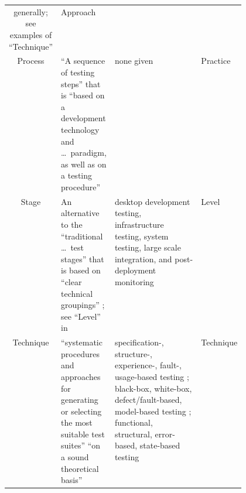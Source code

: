 \begin{table}[hbtp!]
\begin{tabularx}{\linewidth}{|c|X|m{0.37\linewidth}|m{0.1\linewidth}|}
            generally; see examples of
            ``Technique''                      & Approach                                                    \\
            Process                            & ``A sequence of
            testing steps'' \citep[p.~2]{BarbosaEtAl2006} that
            is ``based on a development technology and \dots\
            paradigm, as well as on a testing procedure''
            \citep[p.~3]{BarbosaEtAl2006}      & none given         & Practice                               \\
            Stage                              & An
            alternative to the ``traditional \dots\ test stages'' that is based on
            ``clear technical groupings'' \citep[p.~13]{Gerrard2000a}; see ``Level'' in
            \nameref{tab:ieeeTestTerms}        & desktop
            development testing, infrastructure testing, system testing,
            large scale integration, and post-deployment monitoring
            \citep[p.~13]{Gerrard2000a}        & Level                                                       \\
            Technique                          & ``systematic
            procedures and approaches for generating or selecting the most suitable test
            suites'' \citep[p.~5-10]{SWEBOK2024} ``on a sound theoretical basis''
            \citep[p.~3]{BarbosaEtAl2006}      & specification-,
            structure-, experience-, fault-, usage-based testing \citep[pp.~5-10, 5-13 to 5-15]{SWEBOK2024};
            black-box, white-box, defect/fault-based, model-based testing \citep[p.~3]{SouzaEtAl2017};
            functional, structural, error-based, state-based testing
            \citep[p.~3]{BarbosaEtAl2006}
                                               & Technique                                                   \\
            \hline
      \end{tabularx}
\end{table}

